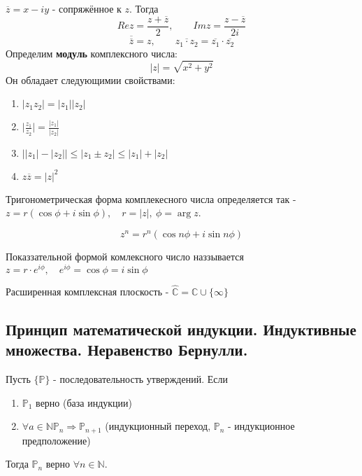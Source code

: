 \documentclass{article}
\begin{document}
\noindent $\overline{z} = x - iy$ - сопряжённое к $z$. Тогда
\begin{equation*}
	Rez = \frac{z + \overline{z}}{2}, \qquad Imz = \frac{z - \overline{z}}{2i}
\end{equation*}
\begin{equation*}
	\overline{\overline{z}} = z, \qquad \overline{z_1 \cdot z_2} = \overline{z_1} \cdot \overline{z_2}
\end{equation*}
Определим {\bf модуль} комплексного числа:
\begin{equation*}
	|z| = \sqrt{x^2 + y^2}
\end{equation*}
Он обладает следующимии свойствами:
\begin{enumerate}
	\item $|z_1z_2| = |z_1||z_2|$
	\item $\displaystyle\Big|\displaystyle\frac{z_1}{z_2}\Big| = \displaystyle\frac{|z_1|}{|z_2|}$
	\item $\big| |z_1| - |z_2| \big| \leq | z_1 \pm z_2| \leq |z_1| + |z_2|$
	\item $z\overline{z} = |z|^2$
\end{enumerate}


 Тригонометрическая форма комплекесного числа определяется так - $z = r(\cos\phi + i\sin\phi),\quad r = |z|,\ \phi=\arg z$.


\begin{equation*}
	z^n = r^n(\cos n\phi + i\sin n\phi)
\end{equation*}


 Показзательной формой комлексного число наззывается $z = r \cdot e^{i\phi}, \quad e^{i\phi} = \cos\phi = i\sin\phi$

 Расширенная комплексная плоскость - $\hat{\mathbb{C}} = \mathbb{C} \cup \{\infty\}$


\subsection{Принцип математической индукции. Индуктивные множества. Неравенство Бернулли.}

 Пусть $\{\mathbb{P}\}$ - последовательность утверждений. Если
\begin{enumerate}
	\item $\mathbb{P}_1$ верно (база индукции)
	\item $\forall a \in \mathbb{N} \mathbb{P}_n \Rightarrow \mathbb{P}_{n + 1}$ (индукционный переход, $\mathbb{P}_n$ - индукционное предположение)
\end{enumerate}
Тогда $\mathbb{P}_n$ верно $\forall n \in \mathbb{N}$.
\end{document}
